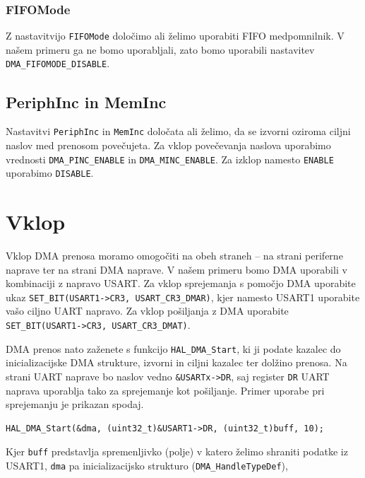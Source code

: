 \documentclass[12pt,letterpaper]{article}
\begin{document}
\subsubsection*{FIFOMode}

Z nastavitvijo \texttt{FIFOMode} določimo ali želimo uporabiti FIFO medpomnilnik. V našem primeru ga ne bomo uporabljali, zato bomo uporabili nastavitev \texttt{DMA\_FIFOMODE\_DISABLE}.

\subsection*{PeriphInc in MemInc}

Nastavitvi \texttt{PeriphInc} in \texttt{MemInc} določata ali želimo, da se izvorni oziroma ciljni naslov med prenosom povečujeta. Za vklop povečevanja naslova uporabimo vrednosti \texttt{DMA\_PINC\_ENABLE} in \texttt{DMA\_MINC\_ENABLE}. Za izklop namesto \texttt{ENABLE} uporabimo \texttt{DISABLE}.


\section*{Vklop}

Vklop DMA prenosa moramo omogočiti na obeh straneh -- na strani periferne naprave ter na strani DMA naprave. V našem primeru bomo DMA uporabili v kombinaciji z napravo USART. Za vklop sprejemanja s pomočjo DMA uporabite ukaz \texttt{SET\_BIT(USART1->CR3, USART\_CR3\_DMAR)}, kjer namesto USART1 uporabite vašo ciljno UART napravo. Za vklop pošiljanja z DMA uporabite \texttt{SET\_BIT(USART1->CR3, USART\_CR3\_DMAT)}.

DMA prenos nato zaženete s funkcijo \texttt{HAL\_DMA\_Start}, ki ji podate kazalec do inicializacijske DMA strukture, izvorni in ciljni kazalec ter dolžino prenosa. Na strani UART naprave bo naslov vedno \texttt{\&USARTx->DR}, saj register \texttt{DR} UART naprava uporablja tako za sprejemanje kot pošiljanje. Primer uporabe pri sprejemanju je prikazan spodaj.

\begin{center}
\begin{lstlisting}[style=CStyle]
HAL_DMA_Start(&dma, (uint32_t)&USART1->DR, (uint32_t)buff, 10);
\end{lstlisting}
\end{center}

Kjer \texttt{buff} predstavlja spremenljivko (polje) v katero želimo shraniti podatke iz USART1, \texttt{dma} pa inicializacijsko strukturo (\texttt{DMA\_HandleTypeDef}), 
\end{document}
